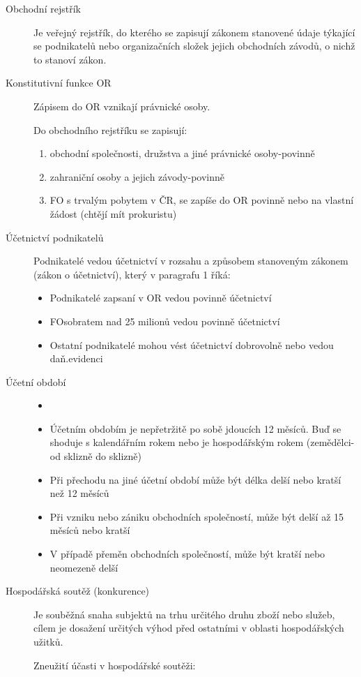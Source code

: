 \begin{description}
        \item[Obchodní rejstřík] Je veřejný rejstřík, do kterého se zapisují zákonem stanovené údaje týkající se podnikatelů nebo organizačních složek jejich obchodních závodů, o nichž to stanoví zákon.
        \item[Konstitutivní funkce OR] Zápisem do OR vznikají právnické osoby. \par Do obchodního rejstříku se zapisují:
            \begin{enumerate}
                \item obchodní společnosti, družstva a jiné právnické osoby-povinně
                \item zahraniční osoby a jejich závody-povinně
                \item FO s trvalým pobytem v ČR, se zapíše do OR povinně nebo na vlastní žádost (chtějí mít prokuristu)			
            \end{enumerate}
        \item[Účetnictví podnikatelů] Podnikatelé vedou účetnictví v rozsahu a způsobem stanoveným zákonem (zákon o účetnictví), který v paragrafu 1 říká:
            \begin{itemize}
                \item Podnikatelé zapsaní v OR vedou povinně účetnictví
                \item FOsobratem nad 25 milionů vedou povinně účetnictví
                \item Ostatní podnikatelé mohou vést účetnictví dobrovolně nebo vedou daň.evidenci
            \end{itemize}
        \item[Účetní období]
            \begin{itemize}
                \item []
                \item Účetním obdobím je nepřetržitě po sobě jdoucích 12 měsíců. Buď se shoduje s kalendářním rokem nebo je hospodářským rokem (zemědělci-od sklizně do sklizně)
                \item Při přechodu na jiné účetní období může být délka delší nebo kratší než 12 měsíců
                \item Při vzniku nebo zániku obchodních společností, může být delší až 15 měsíců nebo kratší
                \item V případě přeměn obchodních společností, může být kratší nebo neomezeně delší
            \end{itemize}
        \item[Hospodářská soutěž (konkurence)] Je souběžná snaha subjektů na trhu určitého druhu zboží nebo služeb, cílem je dosažení určitých výhod před ostatními v oblasti hospodářských užitků.\par Zneužití účasti v hospodářské soutěži:

\end{description}
